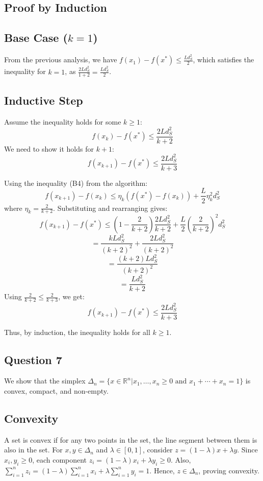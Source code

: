 \documentclass[12p]{article}
\begin{document}
\subsection*{Proof by Induction}

\subsection*{Base Case (\( k = 1 \))}
From the previous analysis, we have \( f(x_1) - f(x^*) \leq \frac{Ld^2_S}{2} \), which satisfies the inequality for \( k = 1 \), as \( \frac{2Ld^2_S}{1+2} = \frac{Ld^2_S}{2} \).

\subsection*{Inductive Step}
Assume the inequality holds for some \( k \geq 1 \):
\[ f(x_k) - f(x^*) \leq \frac{2Ld^2_S}{k+2} \]
We need to show it holds for \( k+1 \):
\[ f(x_{k+1}) - f(x^*) \leq \frac{2Ld^2_S}{k+3} \]

Using the inequality (B4) from the algorithm:
\[ f(x_{k+1}) - f(x_k) \leq \eta_k (f(x^*) - f(x_k)) + \frac{L}{2} \eta_k^2 d^2_S \]
where \( \eta_k = \frac{2}{k+2} \). Substituting and rearranging gives:
\[ f(x_{k+1}) - f(x^*) \leq \left(1 - \frac{2}{k+2}\right) \frac{2Ld^2_S}{k+2} + \frac{L}{2} \left(\frac{2}{k+2}\right)^2 d^2_S \]
\[ = \frac{kLd^2_S}{(k+2)^2} + \frac{2Ld^2_S}{(k+2)^2} \]
\[ = \frac{(k+2)Ld^2_S}{(k+2)^2} \]
\[ = \frac{Ld^2_S}{k+2} \]
Using \( \frac{2}{k+2} \leq \frac{2}{k+3} \), we get:
\[ f(x_{k+1}) - f(x^*) \leq \frac{2Ld^2_S}{k+3} \]

Thus, by induction, the inequality holds for all \( k \geq 1 \).


\subsection*{Question 7} 

We show that the simplex \( \Delta_n = \{x \in \mathbb{R}^n | x_1, \ldots, x_n \geq 0 \text{ and } x_1 + \cdots + x_n = 1\} \) is convex, compact, and non-empty.

\subsection*{Convexity}
A set is convex if for any two points in the set, the line segment between them is also in the set. For \( x, y \in \Delta_n \) and \( \lambda \in [0, 1] \), consider \( z = (1 - \lambda)x + \lambda y \). Since \( x_i, y_i \geq 0 \), each component \( z_i = (1 - \lambda)x_i + \lambda y_i \geq 0 \). Also, \( \sum_{i=1}^n z_i = (1 - \lambda)\sum_{i=1}^n x_i + \lambda\sum_{i=1}^n y_i = 1 \). Hence, \( z \in \Delta_n \), proving convexity.
\end{document}
